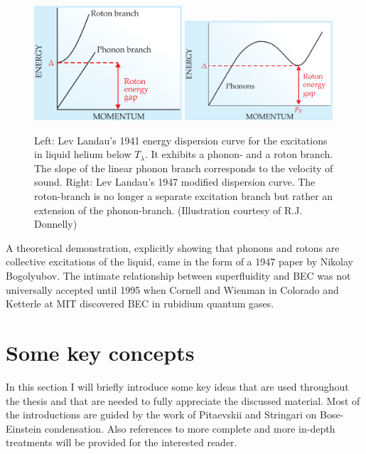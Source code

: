 		\begin{figure}[t]
			\begin{center}
				\includegraphics[width=0.490\textwidth]{phonon-roton-landau-first}\hspace{5pt}
				\includegraphics[width=0.490\textwidth]{phonon-roton-bogoliubov}
			\end{center}
			\caption{Left: Lev Landau's 1941 energy dispersion curve\citep{Landau1941} for the excitations in liquid helium below $T_\lambda$. It exhibits a phonon- and a roton branch. The slope of the linear phonon branch corresponds to the velocity of sound. Right: Lev Landau's 1947 modified dispersion curve. The roton-branch is no longer a separate excitation branch but rather an extension of the phonon-branch. (Illustration courtesy of R.J. Donnelly\citep{Donnelly2009})}
			\label{fig:phonon-roton}
		\end{figure}

		A theoretical demonstration, explicitly showing that phonons and rotons are collective excitations of the liquid, came in the form of a 1947 paper by Nikolay Bogolyubov\citep{Bogolyubov1947}. The intimate relationship between superfluidity and BEC was not universally accepted until 1995 when Cornell and Wienman in Colorado and Ketterle at MIT discovered BEC in rubidium quantum gases\citep{Cornell2002,Ketterle2002}.

	\section{Some key concepts}
		In this section I will briefly introduce some key ideas that are used throughout the thesis and that are needed to fully appreciate the discussed material. Most of the introductions are guided by the work of Pitaevskii and Stringari on Bose-Einstein condensation\citep{Pita2016}. Also references to more complete and more in-depth treatments will be provided for the interested reader.
		
